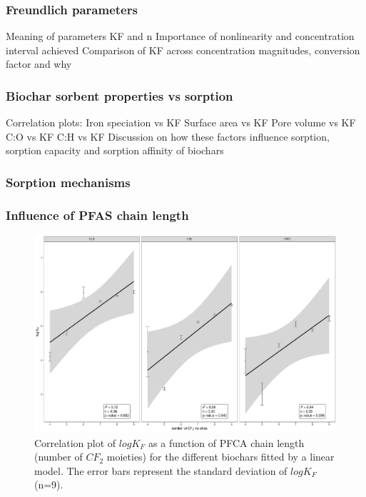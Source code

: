 \subsubsection{Freundlich parameters}
Meaning of parameters KF and n
Importance of nonlinearity and concentration interval achieved 
Comparison of KF across concentration magnitudes, conversion factor and why

\subsubsection{Biochar sorbent properties vs sorption}
Correlation plots:
    Iron speciation vs KF
    Surface area vs KF 
    Pore volume vs KF 
    C:O vs KF 
    C:H vs KF  
Discussion on how these factors influence sorption, sorption capacity and sorption affinity of biochars

\subsubsection{Sorption mechanisms}

\subsubsection{Influence of PFAS chain length}

\begin{figure}
    \centering
    \includegraphics[width=\textwidth]{R/figs/chainlength_KF.pdf}
    \caption{Correlation plot of $log K_F$ as a function of PFCA chain length (number of $CF_2$ moieties) for the different biochars fitted by a linear model. The error bars represent the standard deviation of $log K_F$ (n=9).}
    \label{fig:chainlength}
\end{figure}
 
